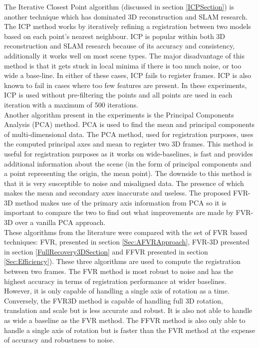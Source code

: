 The Iterative Closest Point algorithm (discussed in section \ref{ICPSection}) is another technique which has dominated 3D reconstruction and SLAM research. The ICP method works by iteratively refining a registration between two models based on each point's nearest neighbour. ICP is popular within both 3D reconstruction and SLAM research because of its accuracy and consistency, additionally it works well on most scene types. The major disadvantage of this method is that it gets stuck in local minima if there is too much noise, or too wide a base-line. In either of these cases, ICP fails to register frames. ICP is also known to fail in cases where too few features are present. In these experiments, ICP is used without pre-filtering the points and all points are used in each iteration with a maximum of 500 iterations. \\

Another algorithm present in the experiments is the Principal Components Analysis (PCA) method. PCA is used to find the mean and principal components of multi-dimensional data. The PCA method, used for registration purposes, uses the computed principal axes and mean to register two 3D frames. This method is useful for registration purposes as it works on wide-baselines, is fast and provides additional information about the scene (in the form of principal components and a point representing the origin, the mean point). The downside  to this method is that it is very susceptible to noise and misaligned data. The presence of which makes the mean and secondary axes inaccurate and useless. The proposed FVR-3D method makes use of the primary axis information from PCA so it is important to compare the two to find out what improvements are made by FVR-3D over a vanilla PCA approach. \\

These algorithms from the literature were compared with the set of FVR based techniques: FVR, presented in section \ref{Sec:AFVRApproach}, FVR-3D presented in section \ref{FullRecovery3DSection} and FFVR presented in section \ref{Sec:Efficiency}). These three algorithms are used to compute the registration between two frames. The FVR method is most robust to noise and has the highest accuracy in terms of registration performance at wider baselines. However, it is only capable of handling a single axis of rotation as a time. Conversely, the FVR3D method is capable of handling full 3D rotation, translation and scale but is less accurate and robust. It is also not able to handle as wide a baseline as the FVR method. The FFVR method is also only able to handle a single axis of rotation but is faster than the FVR method at the expense of accuracy and robustness to noise. \\

